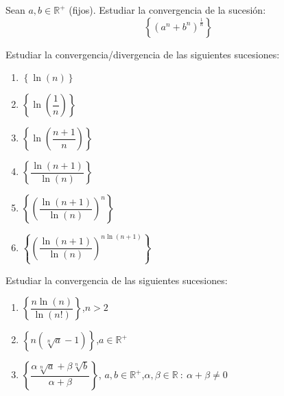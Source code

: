 \begin{ejercicio}
    Sean $a,b \in \mathbb{R}^+$ (fijos). Estudiar la convergencia de la sucesión:
    \begin{equation*}
        \left\{ (a^n + b^n)^\frac{1}{n} \right\}
    \end{equation*}
\end{ejercicio}

\begin{ejercicio}
    Estudiar la convergencia/divergencia de las siguientes sucesiones:
    \begin{enumerate}
        \item $\left\{\ln(n)\right\}$
        \item $\left\{\ln\left(\dfrac{1}{n}\right)\right\}$
        \item $\left\{\ln\left(\dfrac{n+1}{n}\right)\right\}$
        \item $\left\{\dfrac{\ln(n+1)}{\ln(n)}\right\}$
        \item $\left\{ \left(\dfrac{\ln(n+1)}{\ln(n)}\right)^n\right\}$
        \item $\left\{ \left(\dfrac{\ln(n+1)}{\ln(n)}\right)^{n \ln(n+1)}\right\}$
    \end{enumerate}
\end{ejercicio}

\begin{ejercicio}
    Estudiar la convergencia de las siguientes sucesiones:
    \begin{enumerate}
        \item $\left\{ \dfrac{n \ln(n)}{\ln(n!)} \right\}$,\quad $n >2$
        \item $\left\{ n (\sqrt[n]{a}-1) \right\}$,\quad $a \in \mathbb{R}^+$
        \item $\left\{ \dfrac{\alpha \sqrt[n]{a} + \beta \sqrt[n]{b}}{\alpha + \beta} \right\}$, 
        \quad$a,b \in \mathbb{R}^+$,\quad $\alpha, \beta \in \mathbb{R} ~:~ \alpha + \beta \neq 0$
    \end{enumerate}
\end{ejercicio}